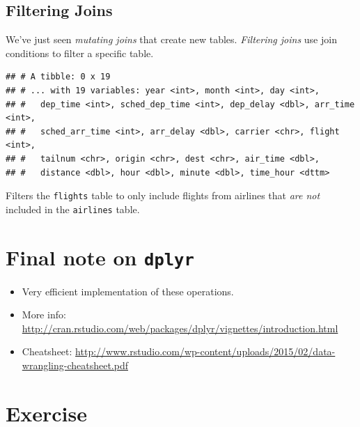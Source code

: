 \documentclass[]{book}
\newenvironment{Shaded}{\begin{snugshade}}{\end{snugshade}}
\newcommand{\KeywordTok}[1]{\textcolor[rgb]{0.13,0.29,0.53}{\textbf{#1}}}
\newcommand{\DataTypeTok}[1]{\textcolor[rgb]{0.13,0.29,0.53}{#1}}
\newcommand{\StringTok}[1]{\textcolor[rgb]{0.31,0.60,0.02}{#1}}
\newcommand{\OperatorTok}[1]{\textcolor[rgb]{0.81,0.36,0.00}{\textbf{#1}}}
\newcommand{\NormalTok}[1]{#1}
\providecommand{\tightlist}{%
  \setlength{\itemsep}{0pt}\setlength{\parskip}{0pt}}
\theoremstyle{definition}
\theoremstyle{definition}
\theoremstyle{remark}
\begin{document}
\subsection{Filtering Joins}\label{filtering-joins}

We've just seen \emph{mutating joins} that create new tables.
\emph{Filtering joins} use join conditions to filter a specific table.

\begin{Shaded}
\end{Shaded}

\begin{verbatim}
## # A tibble: 0 x 19
## # ... with 19 variables: year <int>, month <int>, day <int>,
## #   dep_time <int>, sched_dep_time <int>, dep_delay <dbl>, arr_time <int>,
## #   sched_arr_time <int>, arr_delay <dbl>, carrier <chr>, flight <int>,
## #   tailnum <chr>, origin <chr>, dest <chr>, air_time <dbl>,
## #   distance <dbl>, hour <dbl>, minute <dbl>, time_hour <dttm>
\end{verbatim}

Filters the \texttt{flights} table to only include flights from airlines
that \emph{are not} included in the \texttt{airlines} table.

\section{\texorpdfstring{Final note on
\texttt{dplyr}}{Final note on dplyr}}\label{final-note-on-dplyr}

\begin{itemize}
\tightlist
\item
  Very efficient implementation of these operations.
\item
  More info:
  \url{http://cran.rstudio.com/web/packages/dplyr/vignettes/introduction.html}
\item
  Cheatsheet:
  \url{http://www.rstudio.com/wp-content/uploads/2015/02/data-wrangling-cheatsheet.pdf}
\end{itemize}

\section{Exercise}\label{exercise}
\end{document}
